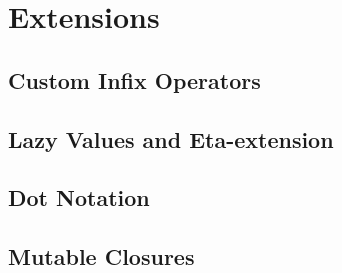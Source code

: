 \chapter{Extensions}
\label{sec:extensions}

\section{Custom Infix Operators}

\section{Lazy Values and Eta-extension}

\section{Dot Notation}

\section{Mutable Closures}
